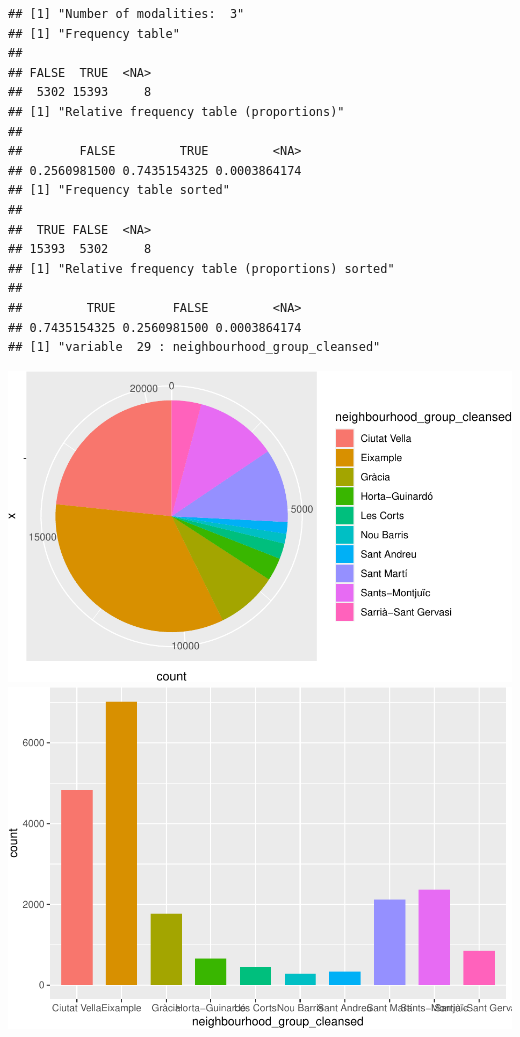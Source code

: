 \begin{verbatim}
## [1] "Number of modalities:  3"
## [1] "Frequency table"
## 
## FALSE  TRUE  <NA> 
##  5302 15393     8 
## [1] "Relative frequency table (proportions)"
## 
##        FALSE         TRUE         <NA> 
## 0.2560981500 0.7435154325 0.0003864174 
## [1] "Frequency table sorted"
## 
##  TRUE FALSE  <NA> 
## 15393  5302     8 
## [1] "Relative frequency table (proportions) sorted"
## 
##         TRUE        FALSE         <NA> 
## 0.7435154325 0.2560981500 0.0003864174 
## [1] "variable  29 : neighbourhood_group_cleansed"
\end{verbatim}

\includegraphics[width=0.5\linewidth]{anal_files/figure-latex/figures-side-12}
\includegraphics[width=0.5\linewidth]{anal_files/figure-latex/figures-side-13}

